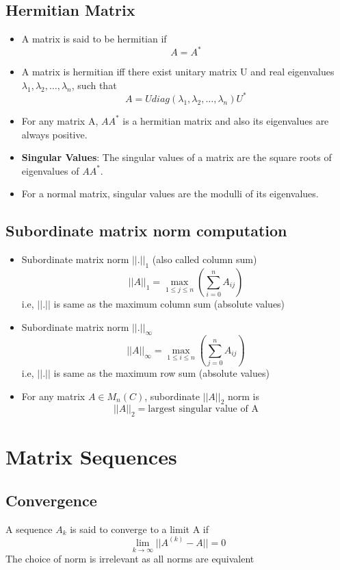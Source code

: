 \documentclass{article}
\begin{document}
\subsection{Hermitian Matrix}
	\begin{itemize}
	\item A matrix is said to be hermitian if
		\[A = A^*\]
	\item A matrix is hermitian iff there exist unitary matrix U and real eigenvalues $\lambda_1,\lambda_2,\hdots,\lambda_n$, such that 
		\[A = Udiag(\lambda_1,\lambda_2,\hdots,\lambda_n) U^*\]

	\item For any matrix A, $AA^*$ is a hermitian matrix and also its eigenvalues are always positive. 
	\item \textbf{Singular Values}: The singular values of a matrix are the square roots of eigenvalues of $AA^*$.
	\item For a normal matrix, singular values are the modulli of its eigenvalues.

	\end{itemize}

\subsection{Subordinate matrix norm computation}
	\begin{itemize}
	\item Subordinate matrix norm $||.||_1$ (also called column sum)
		\[||A||_1 = \max_{1\leq j\leq n} (\sum_{i=0}^n A_{ij})\]
	i.e, $||.||$ is same as the maximum column sum (absolute values)

	\item Subordinate matrix norm $||.||_\infty$ 
		\[||A||_\infty = \max_{1\leq i\leq n} (\sum_{j=0}^n A_{ij})\]
	i.e, $||.||$ is same as the maximum row sum (absolute values)

	\item For any matrix $A \in M_n(C)$, subordinate $||A||_2$ norm is
		\[||A||_2 = \text{largest singular value of A} \]

	\end{itemize}

\section{Matrix Sequences}
	\subsection{Convergence}
	A sequence $A_k$ is said to converge to a limit A if
		\[\lim_{k\rightarrow \infty} ||A^{(k)}-A|| =0\]
	The choice of norm is irrelevant as all norms are equivalent
\end{document}
